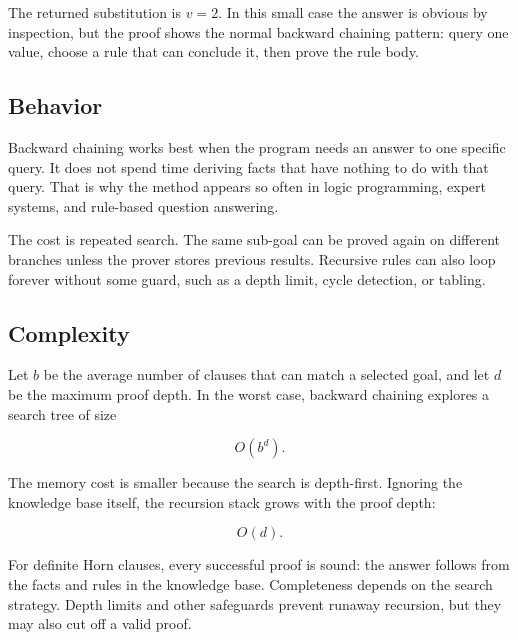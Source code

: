 The returned substitution is $v = 2$.
In this small case the answer is obvious by inspection, but the proof shows
the normal backward chaining pattern: query one value, choose a rule that can
conclude it, then prove the rule body.

\subsection{Behavior}

Backward chaining works best when the program needs an answer to one specific
query.
It does not spend time deriving facts that have nothing to do with that query.
That is why the method appears so often in logic programming, expert systems,
and rule-based question answering.

The cost is repeated search.
The same sub-goal can be proved again on different branches unless the prover
stores previous results.
Recursive rules can also loop forever without some guard, such as a depth
limit, cycle detection, or tabling.

\subsection{Complexity}

Let $b$ be the average number of clauses that can match a selected goal, and
let $d$ be the maximum proof depth.
In the worst case, backward chaining explores a search tree of size

\begin{equation}
  O(b^d).
\end{equation}

The memory cost is smaller because the search is depth-first.
Ignoring the knowledge base itself, the recursion stack grows with the proof
depth:

\begin{equation}
  O(d).
\end{equation}

For definite Horn clauses, every successful proof is sound: the answer follows
from the facts and rules in the knowledge base.
Completeness depends on the search strategy.
Depth limits and other safeguards prevent runaway recursion, but they may also
cut off a valid proof.
